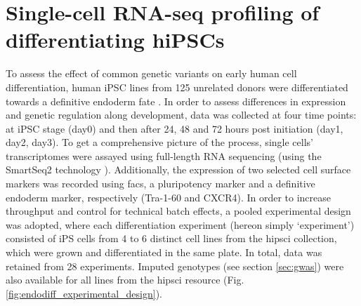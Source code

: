 
\newpage

\section{Single-cell RNA-seq profiling of differentiating hiPSCs}
\label{sec:endodiff_summary}

To assess the effect of common genetic variants on early human cell differentiation, human iPSC lines from 125 unrelated donors were differentiated towards a definitive endoderm fate \cite{hannan2013production}.
In order to assess differences in expression and genetic regulation along development, data was collected at four 
time points: at iPSC stage (day0) and then after 24, 48 and 72 hours post initiation (day1, day2, day3).
To get a comprehensive picture of the process, single cells' transcriptomes were assayed using full-length RNA sequencing (using the SmartSeq2 technology \cite{picelli2013smart}).
Additionally, the expression of two selected cell surface markers was recorded using \gls{facs}, a pluripotency marker and a definitive endoderm marker, respectively (Tra-1-60 and CXCR4).
In order to increase throughput and control for technical batch effects, 
a pooled experimental design
was adopted, where each differentiation experiment (hereon simply `experiment') consisted of iPS cells from 4 to 6 distinct cell lines from the \gls{hipsci} collection, which were grown and differentiated in the same plate.
In total, data was retained from 28 experiments.
Imputed genotypes (see section \ref{sec:gwas}) were also available for all lines from the \gls{hipsci} resource (Fig. \ref{fig:endodiff_experimental_design}).

